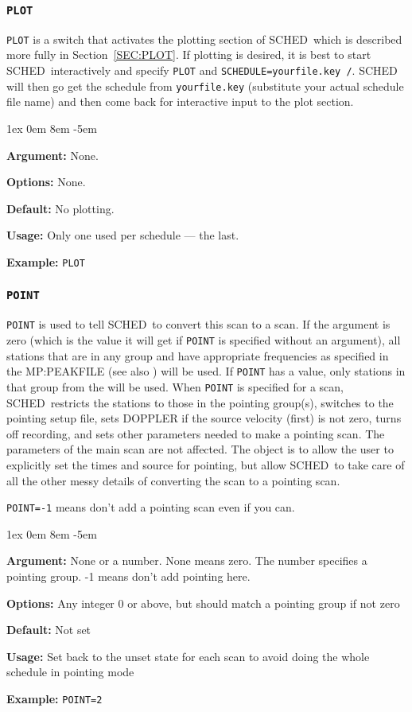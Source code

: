 \documentclass{report}
\newcommand{\schedb}{{\sc SCHED~}}
\newcommand{\rcwbox}[5]{
  \begin{list}{}{\parsep 1ex  \itemsep 0em
                 \leftmargin 8em  \itemindent -5em }
    \item {\bf Argument:} #1
    \item {\bf Options:}  #2
    \item {\bf Default:}  #3
    \item {\bf Usage:}    #4
    \item {\bf Example:}  #5
  \end{list}
}
\begin{document}
\subsubsection{\label{MP:PLOT}{\tt PLOT}}

{\tt PLOT} is a switch that activates the plotting section of
\schedb which is described more fully in Section~\ref{SEC:PLOT}.
If plotting is desired, it is best to start \schedb interactively
and specify {\tt PLOT} and {\tt SCHEDULE=yourfile.key /}.  \schedb
will then go get the schedule from {\tt yourfile.key} (substitute
your actual schedule file name) and then come back for interactive
input to the plot section.

\rcwbox
{None.}
{None.}
{No plotting.}
{Only one used per schedule --- the last.}
{{\tt PLOT}}


\subsubsection{\label{MP:POINT}{\tt POINT}}

{\tt POINT} is used to tell \schedb to convert this scan to a
 scan.  If the argument
is zero (which is the value it will get if {\tt POINT} is specified
without an argument), all stations that are in any group and have
appropriate frequencies as specified in the 
{MP:PEAKFILE} (see also ) will
be used.  If {\tt POINT} has a value, only stations in that group
from the  will be used.  When
{\tt POINT} is specified for a scan, \schedb restricts the stations
to those in the pointing group(s), switches to the pointing setup
file, sets DOPPLER if the source velocity (first) is not zero, turns
off recording, and sets other parameters needed to make a pointing
scan.  The parameters of the main scan are not affected.  The object
is to allow the user to explicitly set the times and source for
pointing, but allow \schedb to take care of all the other messy
details of converting the scan to a pointing scan.

{\tt POINT=-1} means don't add a pointing scan even if you can.

\rcwbox
{None or a number.  None means zero.  The number specifies a pointing group.  -1 means don't add pointing here.}
{Any integer 0 or above, but should match a pointing group if not zero}
{Not set}
{Set back to the unset state for each scan to avoid doing the
whole schedule in pointing mode}
{{\tt POINT=2}}
\end{document}

